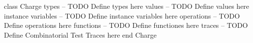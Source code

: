 \begin{vdmpp}[breaklines=true]
class Charge
types
-- TODO Define types here
values
-- TODO Define values here
instance variables
-- TODO Define instance variables here
operations
-- TODO Define operations here
functions
-- TODO Define functiones here
traces
-- TODO Define Combinatorial Test Traces here
end Charge
\end{vdmpp}
